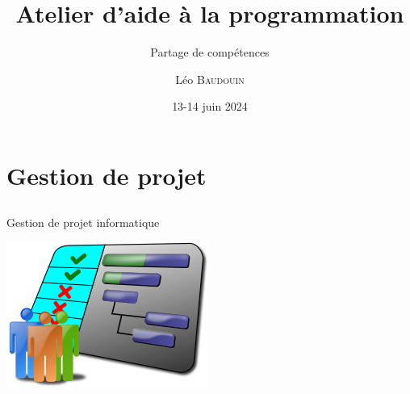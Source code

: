 \documentclass{beamer}
\title{Atelier d'aide à la programmation}
\subtitle{Partage de compétences}
\author{L\'eo \textsc{Baudouin}}
\institute{
  {\url{baudouin.leo @ gmail.com}}
}
\date{13-14 juin 2024}
\begin{document}
\begin{frame}
  \titlepage
\end{frame}




\section{Gestion de projet}
\subsection{}

\begin{frame}{Gestion de projet informatique}
\begin{center}
\includegraphics[width=0.5\linewidth]{images/project}

\end{center}
\end{frame}
\end{document}
